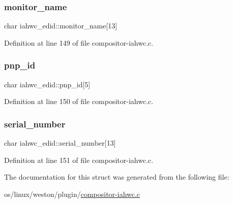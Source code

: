 \mbox{\label{structiahwc__edid_a8ac7bf02ad2abf916be5bc2ce10c9349}} 
\subsubsection{\texorpdfstring{monitor\+\_\+name}{monitor\_name}}
{\footnotesize\ttfamily char iahwc\+\_\+edid\+::monitor\+\_\+name\mbox{[}13\mbox{]}}



Definition at line 149 of file compositor-\/iahwc.\+c.

\mbox{\label{structiahwc__edid_a6e9458c0d30020543837fe1212ff431a}} 
\subsubsection{\texorpdfstring{pnp\+\_\+id}{pnp\_id}}
{\footnotesize\ttfamily char iahwc\+\_\+edid\+::pnp\+\_\+id\mbox{[}5\mbox{]}}



Definition at line 150 of file compositor-\/iahwc.\+c.

\mbox{\label{structiahwc__edid_abeb28c4382a7d860385907cde82ce58d}} 
\subsubsection{\texorpdfstring{serial\+\_\+number}{serial\_number}}
{\footnotesize\ttfamily char iahwc\+\_\+edid\+::serial\+\_\+number\mbox{[}13\mbox{]}}



Definition at line 151 of file compositor-\/iahwc.\+c.



The documentation for this struct was generated from the following file\+:\begin{DoxyCompactItemize}
\item 
os/linux/weston/plugin/\mbox{\hyperlink{compositor-iahwc_8c}{compositor-\/iahwc.\+c}}\end{DoxyCompactItemize}
